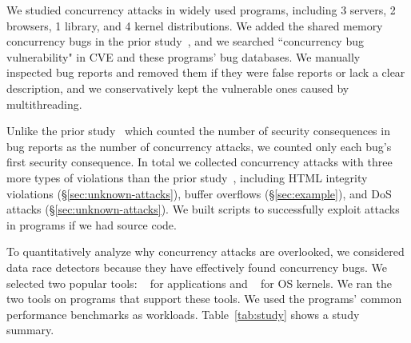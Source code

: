 


We studied concurrency attacks in \nprog widely used programs, including 3 
servers, 2 browsers, 1 library, and 4 kernel distributions. We 
added the shared memory concurrency bugs in the prior 
study~\cite{con:hotpar12}, and we searched ``concurrency bug vulnerability" in 
CVE and these programs' bug databases. We manually inspected bug reports 
and removed them if they were false reports or lack a clear description, and 
we conservatively kept the vulnerable ones caused by multithreading.

Unlike the prior study~\cite{con:hotpar12} which counted the number of 
security consequences in bug reports as the number of concurrency attacks, 
we counted only each bug's first security consequence. In total we collected 
\nattacks concurrency attacks with three more types of violations than the 
prior study~\cite{con:hotpar12}, including HTML integrity violations 
(\S\ref{sec:unknown-attacks}), buffer overflows (\S\ref{sec:example}), and DoS 
attacks (\S\ref{sec:unknown-attacks}). We built scripts to successfully exploit 
\nreproduced attacks in \nreproducedProgs programs if we had source code.

To quantitatively analyze why concurrency attacks are overlooked, we  
considered data race detectors because they have effectively 
found concurrency bugs. We selected two popular tools: \tsan~\cite{tsan:wbia09} 
for applications and \ski~\cite{ski:osdi14} for OS kernels. We ran the two 
tools on \nreproducedProgs programs that support these tools. We used the 
programs' common performance benchmarks as workloads. 
Table~\ref{tab:study} shows a study summary.

